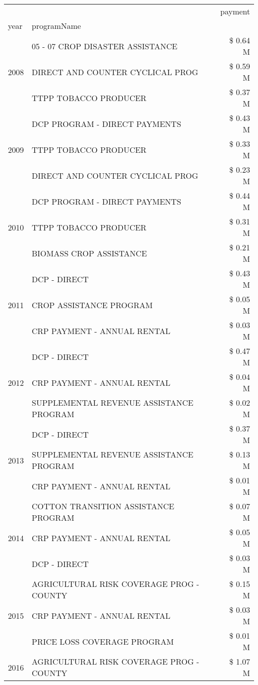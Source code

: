 \begin{tabular}{llr}
\toprule
 &  & payment \\
year & programName &  \\
\midrule
\multirow[t]{3}{*}{2008} & 05 - 07 CROP DISASTER ASSISTANCE & \$ 0.64 M \\
 & DIRECT AND COUNTER CYCLICAL PROG & \$ 0.59 M \\
 & TTPP TOBACCO PRODUCER & \$ 0.37 M \\
\cline{1-3}
\multirow[t]{3}{*}{2009} & DCP PROGRAM - DIRECT PAYMENTS & \$ 0.43 M \\
 & TTPP TOBACCO PRODUCER & \$ 0.33 M \\
 & DIRECT AND COUNTER CYCLICAL PROG & \$ 0.23 M \\
\cline{1-3}
\multirow[t]{3}{*}{2010} & DCP PROGRAM - DIRECT PAYMENTS & \$ 0.44 M \\
 & TTPP TOBACCO PRODUCER & \$ 0.31 M \\
 & BIOMASS CROP ASSISTANCE & \$ 0.21 M \\
\cline{1-3}
\multirow[t]{3}{*}{2011} & DCP - DIRECT & \$ 0.43 M \\
 & CROP ASSISTANCE PROGRAM & \$ 0.05 M \\
 & CRP PAYMENT - ANNUAL RENTAL & \$ 0.03 M \\
\cline{1-3}
\multirow[t]{3}{*}{2012} & DCP - DIRECT & \$ 0.47 M \\
 & CRP PAYMENT - ANNUAL RENTAL & \$ 0.04 M \\
 & SUPPLEMENTAL REVENUE ASSISTANCE PROGRAM & \$ 0.02 M \\
\cline{1-3}
\multirow[t]{3}{*}{2013} & DCP - DIRECT & \$ 0.37 M \\
 & SUPPLEMENTAL REVENUE ASSISTANCE PROGRAM & \$ 0.13 M \\
 & CRP PAYMENT - ANNUAL RENTAL & \$ 0.01 M \\
\cline{1-3}
\multirow[t]{3}{*}{2014} & COTTON TRANSITION ASSISTANCE PROGRAM & \$ 0.07 M \\
 & CRP PAYMENT - ANNUAL RENTAL & \$ 0.05 M \\
 & DCP - DIRECT & \$ 0.03 M \\
\cline{1-3}
\multirow[t]{3}{*}{2015} & AGRICULTURAL RISK COVERAGE PROG - COUNTY & \$ 0.15 M \\
 & CRP PAYMENT - ANNUAL RENTAL & \$ 0.03 M \\
 & PRICE LOSS COVERAGE PROGRAM & \$ 0.01 M \\
\cline{1-3}
\multirow[t]{3}{*}{2016} & AGRICULTURAL RISK COVERAGE PROG - COUNTY & \$ 1.07 M \\

\end{tabular}
